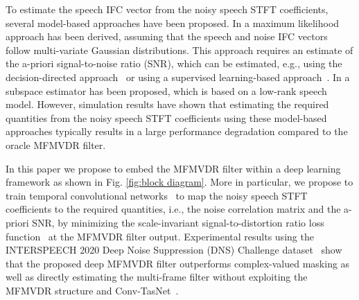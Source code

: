 \documentclass{article}
\begin{document}
To estimate the speech IFC vector from the noisy speech STFT coefficients, several model-based approaches have been proposed.
In \cite{schasse_estimation_2014} a maximum likelihood approach has been derived, assuming that the speech and noise IFC vectors follow multi-variate Gaussian distributions.
This approach requires an estimate of the a-priori signal-to-noise ratio (SNR), which can be estimated, e.g., using the decision-directed approach~\cite{ephraim_speech_1984} or using a supervised learning-based approach~\cite{tammen_dnn-based_2020}.
In \cite{fischer_subspace-based_2020} a subspace estimator has been proposed, which is based on a low-rank speech model.
However, simulation results have shown that estimating the required quantities from the noisy speech STFT coefficients using these model-based approaches typically results in a large performance degradation compared to the oracle MFMVDR filter.

In this paper we propose to embed the MFMVDR filter within a deep learning framework as shown in Fig. \ref{fig:block diagram}.
More in particular, we propose to train temporal convolutional networks~\cite{bai_empirical_2018,luo_conv-tasnet_2019} to map the noisy speech STFT coefficients to the required quantities, i.e., the noise correlation matrix and the a-priori SNR, by minimizing the scale-invariant signal-to-distortion ratio loss function~\cite{roux_sdr_2019} at the MFMVDR filter output.
Experimental results using the INTERSPEECH 2020 Deep Noise Suppression (DNS) Challenge dataset~\cite{reddy_interspeech_2020} show that the proposed deep MFMVDR filter outperforms complex-valued masking as well as directly estimating the multi-frame filter without exploiting the MFMVDR structure and Conv-TasNet~\cite{luo_conv-tasnet_2019}.
\end{document}
